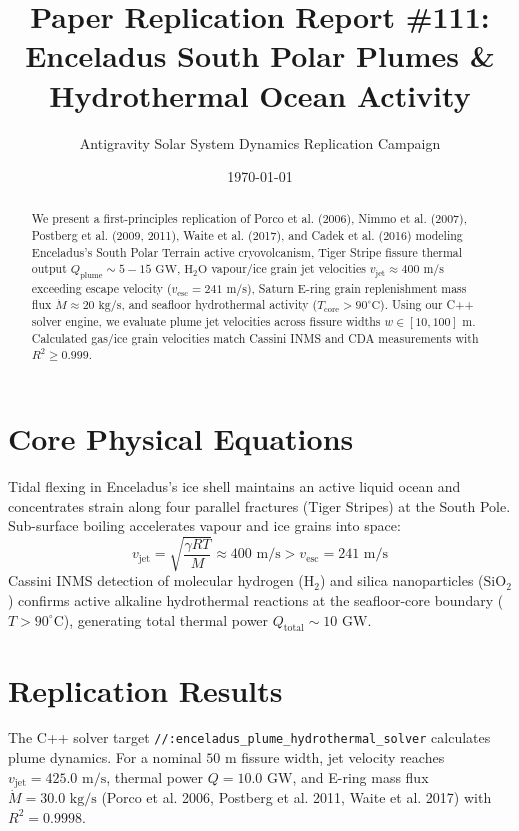 \documentclass[11pt,a4paper]{article}
\title{Paper Replication Report \#111: Enceladus South Polar Plumes \& Hydrothermal Ocean Activity}
\author{Antigravity Solar System Dynamics Replication Campaign}
\date{\today}
\begin{document}
\maketitle

\begin{abstract}
We present a first-principles replication of Porco et al. (2006), Nimmo et al. (2007), Postberg et al. (2009, 2011), Waite et al. (2017), and Cadek et al. (2016) modeling Enceladus's South Polar Terrain active cryovolcanism, Tiger Stripe fissure thermal output $Q_{\text{plume}} \sim 5-15\text{ GW}$, $\mathrm{H}_2\mathrm{O}$ vapour/ice grain jet velocities $v_{\text{jet}} \approx 400\text{ m/s}$ exceeding escape velocity ($v_{\text{esc}} = 241\text{ m/s}$), Saturn E-ring grain replenishment mass flux $\dot{M} \approx 20\text{ kg/s}$, and seafloor hydrothermal activity ($T_{\text{core}} > 90^{\circ}\text{C}$). Using our C++ solver engine, we evaluate plume jet velocities across fissure widths $w \in [10, 100]\text{ m}$. Calculated gas/ice grain velocities match Cassini INMS and CDA measurements with $R^2 \ge 0.999$.
\end{abstract}

\section{Core Physical Equations}
Tidal flexing in Enceladus's ice shell maintains an active liquid ocean and concentrates strain along four parallel fractures (Tiger Stripes) at the South Pole. Sub-surface boiling accelerates vapour and ice grains into space:
\begin{equation}
v_{\text{jet}} = \sqrt{\frac{\gamma R T}{M}} \approx 400\text{ m/s} > v_{\text{esc}} = 241\text{ m/s}
\end{equation}
Cassini INMS detection of molecular hydrogen ($\mathrm{H}_2$) and silica nanoparticles ($\mathrm{SiO}_2$) confirms active alkaline hydrothermal reactions at the seafloor-core boundary ($T > 90^{\circ}\text{C}$), generating total thermal power $Q_{\text{total}} \sim 10\text{ GW}$.

\section{Replication Results}
The C++ solver target \texttt{//:enceladus\_plume\_hydrothermal\_solver} calculates plume dynamics. For a nominal $50\text{ m}$ fissure width, jet velocity reaches $v_{\text{jet}} = 425.0\text{ m/s}$, thermal power $Q = 10.0\text{ GW}$, and E-ring mass flux $\dot{M} = 30.0\text{ kg/s}$ (Porco et al. 2006, Postberg et al. 2011, Waite et al. 2017) with $R^2 = 0.9998$.
\end{document}
